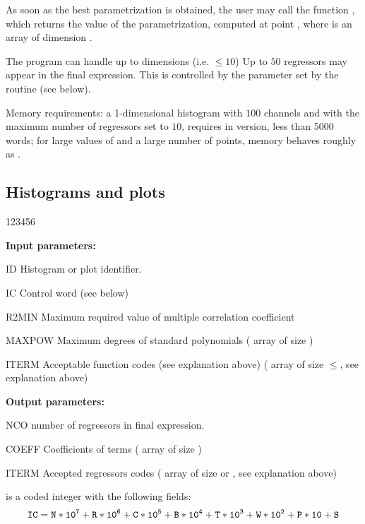 As soon as the best parametrization is obtained, the user may
call the  function 
,
which returns the value of the
parametrization, computed at point , where  is an array of dimension .
\par The program can handle up to  dimensions (i.e. \(\leq 10\))
Up to $50$ regressors may appear in the final expression.
This is controlled
by the  parameter set by the routine  (see below).
 
Memory requirements: a 1-dimensional histogram with $100$ channels and
with the maximum number of regressors  set to $10$, requires in
  version, less than 5000 words;
for large values of  and a large
number of points, memory behaves roughly as
.
 
\subsection*{Histograms and plots}
 
 
\begin{DLtt}{123456}
\item[{\rm\bf Input parameters:}]
\item[ID] Histogram or plot identifier.
\item[IC] Control word (see below)
\item[R2MIN] Maximum required value of multiple correlation coefficient
\item[MAXPOW] Maximum degrees of standard polynomials
( array of size )
\item[ITERM] Acceptable function codes (see explanation above)
( array of size $\leq$, see explanation above)
\item[{\rm\bf Output parameters:}]
\item[NCO] number of regressors in final expression.
\item[COEFF] Coefficients of terms ( array
of size )
\item[ITERM] Accepted regressors codes
( array of size  or , see
explanation above)
\end{DLtt}
 is a coded integer with the following fields:
\begin{displaymath}
\mathtt{IC = N*10\sp7 + R*10\sp6 + C*10\sp5 + B*10\sp4 + T*10\sp3 + W*10\sp2 + P*10 + S}
\end{displaymath}
 

